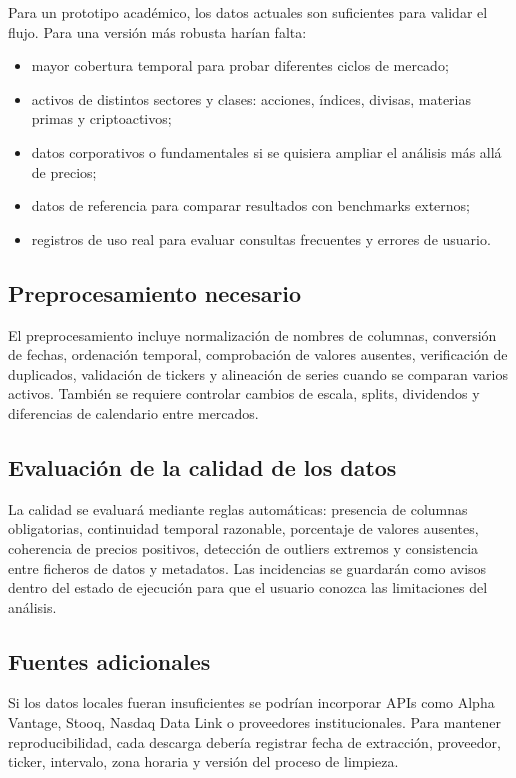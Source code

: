 \documentclass[11pt,a4paper]{article}
\begin{document}
Para un prototipo acad\'emico, los datos actuales son suficientes para validar el flujo. Para una versi\'on m\'as robusta har\'ian falta:

\begin{itemize}
    \item mayor cobertura temporal para probar diferentes ciclos de mercado;
    \item activos de distintos sectores y clases: acciones, \'indices, divisas, materias primas y criptoactivos;
    \item datos corporativos o fundamentales si se quisiera ampliar el an\'alisis m\'as all\'a de precios;
    \item datos de referencia para comparar resultados con benchmarks externos;
    \item registros de uso real para evaluar consultas frecuentes y errores de usuario.
\end{itemize}

\subsection{Preprocesamiento necesario}

El preprocesamiento incluye normalizaci\'on de nombres de columnas, conversi\'on de fechas, ordenaci\'on temporal, comprobaci\'on de valores ausentes, verificaci\'on de duplicados, validaci\'on de tickers y alineaci\'on de series cuando se comparan varios activos. Tambi\'en se requiere controlar cambios de escala, splits, dividendos y diferencias de calendario entre mercados.

\subsection{Evaluaci\'on de la calidad de los datos}

La calidad se evaluar\'a mediante reglas autom\'aticas: presencia de columnas obligatorias, continuidad temporal razonable, porcentaje de valores ausentes, coherencia de precios positivos, detecci\'on de outliers extremos y consistencia entre ficheros de datos y metadatos. Las incidencias se guardar\'an como avisos dentro del estado de ejecuci\'on para que el usuario conozca las limitaciones del an\'alisis.

\subsection{Fuentes adicionales}

Si los datos locales fueran insuficientes se podr\'ian incorporar APIs como Alpha Vantage, Stooq, Nasdaq Data Link o proveedores institucionales. Para mantener reproducibilidad, cada descarga deber\'ia registrar fecha de extracci\'on, proveedor, ticker, intervalo, zona horaria y versi\'on del proceso de limpieza.
\end{document}
